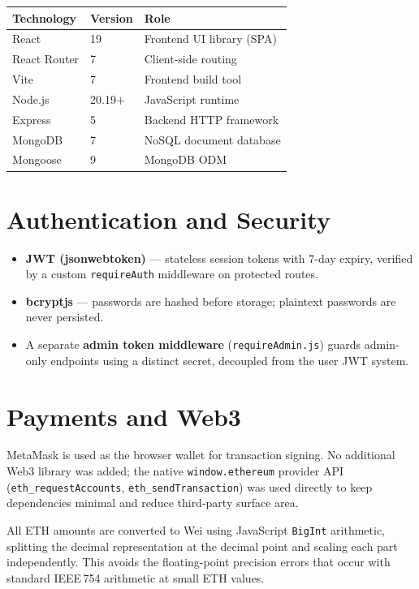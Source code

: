 \documentclass[11pt, a4paper]{report}
\begin{document}
\vspace{4pt}
\begin{tabularx}{\linewidth}{L{3cm} L{3.5cm} X}
  \toprule
  \textbf{Technology} & \textbf{Version} & \textbf{Role} \\
  \midrule
  React            & 19       & Frontend UI library (SPA) \\
  React Router     & 7        & Client-side routing \\
  Vite             & 7        & Frontend build tool \\
  Node.js          & 20.19+   & JavaScript runtime \\
  Express          & 5        & Backend HTTP framework \\
  MongoDB          & 7        & NoSQL document database \\
  Mongoose         & 9        & MongoDB ODM \\
  \bottomrule
\end{tabularx}

\section{Authentication and Security}

\begin{itemize}
  \item \textbf{JWT (jsonwebtoken)} — stateless session tokens with 7-day expiry, verified by a custom \texttt{requireAuth} middleware on protected routes.
  \item \textbf{bcryptjs} — passwords are hashed before storage; plaintext passwords are never persisted.
  \item A separate \textbf{admin token middleware} (\texttt{requireAdmin.js}) guards admin-only endpoints using a distinct secret, decoupled from the user JWT system.
\end{itemize}

\section{Payments and Web3}

MetaMask is used as the browser wallet for transaction signing. No additional Web3 library was added; the native \texttt{window.ethereum} provider API (\texttt{eth\_requestAccounts}, \texttt{eth\_sendTransaction}) was used directly to keep dependencies minimal and reduce third-party surface area.

All ETH amounts are converted to Wei using JavaScript \texttt{BigInt} arithmetic, splitting the decimal representation at the decimal point and scaling each part independently. This avoids the floating-point precision errors that occur with standard IEEE\,754 arithmetic at small ETH values.
\end{document}
